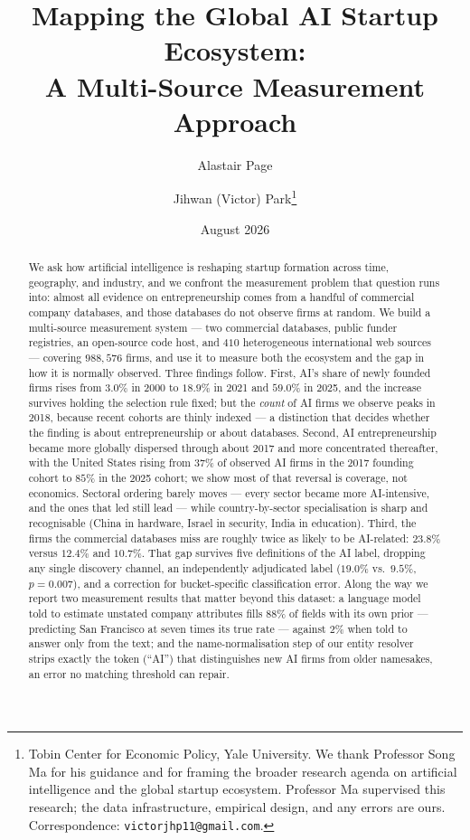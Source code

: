 \documentclass[11pt]{article}
\title{\textbf{Mapping the Global AI Startup Ecosystem:}\\[0.35em]
\large A Multi-Source Measurement Approach}
\author{Alastair Page \and Jihwan (Victor) Park\thanks{%
Tobin Center for Economic Policy, Yale University. We thank Professor Song Ma
for his guidance and for framing the broader research agenda on artificial
intelligence and the global startup ecosystem. Professor Ma supervised this
research; the data infrastructure, empirical design, and any errors are ours.
Correspondence: \texttt{victorjhp11@gmail.com}.}}
\date{August 2026}
\begin{document}
\maketitle

\begin{abstract}
\noindent
We ask how artificial intelligence is reshaping startup formation across time,
geography, and industry, and we confront the measurement problem that question
runs into: almost all evidence on entrepreneurship comes from a handful of
commercial company databases, and those databases do not observe firms at
random. We build a multi-source measurement system --- two commercial
databases, public funder registries, an open-source code host, and $410$
heterogeneous international web sources --- covering $988{,}576$ firms, and use
it to measure both the ecosystem and the gap in how it is normally observed.
Three findings follow. First, AI's share of newly founded firms rises from
$3.0\%$ in 2000 to $18.9\%$ in 2021 and $59.0\%$ in 2025, and the increase
survives holding the selection rule fixed; but the \emph{count} of AI firms we
observe peaks in 2018, because recent cohorts are thinly indexed --- a
distinction that decides whether the finding is about entrepreneurship or about
databases. Second, AI entrepreneurship became more globally dispersed through
about 2017 and more concentrated thereafter, with the United States rising from
$37\%$ of observed AI firms in the 2017 founding cohort to $85\%$ in the 2025
cohort; we show most of that reversal is coverage, not economics. Sectoral ordering barely moves --- every
sector became more AI-intensive, and the ones that led still lead --- while
country-by-sector specialisation is sharp and recognisable (China in hardware,
Israel in security, India in education). Third, the firms the commercial
databases miss are roughly twice as likely to be AI-related: $23.8\%$ versus
$12.4\%$ and $10.7\%$. That gap survives five definitions of the AI label,
dropping any single discovery channel, an independently adjudicated label
($19.0\%$ vs.\ $9.5\%$, $p=0.007$), and a correction for bucket-specific
classification error. Along the way we report two measurement results that
matter beyond this dataset: a language model told to estimate unstated company
attributes fills $88\%$ of fields with its own prior --- predicting San
Francisco at seven times its true rate --- against $2\%$ when told to answer
only from the text; and the name-normalisation step of our entity resolver
strips exactly the token (``AI'') that distinguishes new AI firms from older
namesakes, an error no matching threshold can repair.
\end{abstract}
\end{document}
